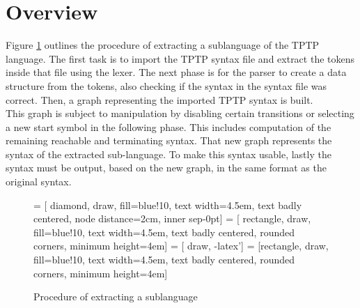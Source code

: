 \section{Overview}\label{sec:ConceptOverview}
Figure \ref{fig:ConceptProcessSublanguage} outlines the procedure of extracting a sublanguage of the \ac{TPTP} language.
The first task is to import the \ac{TPTP} syntax file and extract the tokens inside that file using the lexer.
The next phase is for the parser to create a data structure from the tokens, also checking if the syntax in the syntax file was correct.
Then, a graph representing the imported \ac{TPTP} syntax is built.\\
This graph is subject to manipulation by disabling certain transitions or selecting a new start symbol in the following phase.
This includes computation of the remaining reachable and terminating syntax.
That new graph represents the syntax of the extracted sub-language.
To make this syntax usable, lastly the syntax must be output, based on the new graph, in the same format as the original syntax.
\begin{figure}[H]
 = [ diamond, draw, fill=blue!10, text width=4.5em, text badly centered, node distance=2cm, inner sep-0pt]  
 = [ rectangle, draw, fill=blue!10, text width=4.5em, text badly centered, rounded corners, minimum height=4em]  
 = [ draw, -latex']  
 = [rectangle, draw, fill=blue!10, text width=4.5em, text badly centered, rounded corners, minimum height=4em]  
\begin{center}
\end{center}
\caption{Procedure of extracting a sublanguage}
\label{fig:ConceptProcessSublanguage}
\end{figure}

